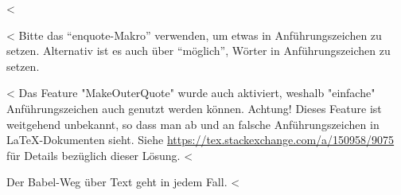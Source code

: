 <%

<%
Bitte das \enquote{enquote-Makro} verwenden, um etwas in Anführungszeichen zu setzen.
Alternativ ist es auch über "`möglich"', Wörter in Anführungszeichen zu setzen.

<%
Das Feature "MakeOuterQuote" wurde auch aktiviert, weshalb "einfache" Anführungszeichen auch genutzt werden können.
Achtung! Dieses Feature ist weitgehend unbekannt, so dass man ab und an falsche Anführungszeichen in \LaTeX-Dokumenten sieht.
Siehe \url{https://tex.stackexchange.com/a/150958/9075} für Details bezüglich dieser Lösung.
<%

Der Babel-Weg über \glqq{}Text\grqq{} geht in jedem Fall.
<%
